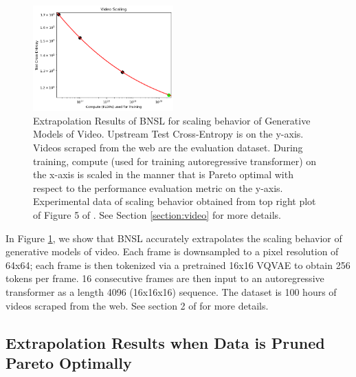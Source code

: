 \documentclass{article} %
\begin{document}
\begin{figure}[htbp]
    \centering
\includegraphics[width=0.48\textwidth]{figures/video/video__compute.png}

    \caption{
Extrapolation Results of BNSL for scaling behavior of Generative Models of Video. Upstream Test Cross-Entropy is on the y-axis. Videos scraped from the web are the evaluation dataset. During training, compute (used for training autoregressive transformer) on the x-axis is scaled in the manner that is Pareto optimal with respect to the performance evaluation metric on the y-axis. Experimental data of scaling behavior obtained from top right plot of Figure 5 of \cite{2020arXiv201014701H}. See Section \ref{section:video} for more details.
    }
    \label{fig:video_compute_scaling}
\end{figure}

In Figure \ref{fig:video_compute_scaling}, we show that BNSL accurately extrapolates the scaling behavior of generative models of video. Each frame is downsampled to a pixel resolution of 64x64; each frame is then tokenized via a pretrained 16x16 VQVAE \citep{van2017neural} to obtain 256 tokens per frame. 16 consecutive frames are then input to an autoregressive transformer as a length 4096 (16x16x16) sequence. The dataset is 100 hours of videos scraped from the web. See section 2 of \cite{2020arXiv201014701H} for more details.

\FloatBarrier

\clearpage

\subsection{Extrapolation Results when Data is Pruned Pareto Optimally}
\label{section:data_prune}
\end{document}
